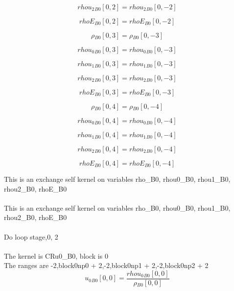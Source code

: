 \documentclass{article}
\begin{document}
\begin{dmath}{rhou_{2}{_{B0}}}[{0,2}] = {rhou_{2}{_{B0}}}[{0,-2}]\end{dmath}

\begin{dmath}{rhoE{_{B0}}}[{0,2}] = {rhoE{_{B0}}}[{0,-2}]\end{dmath}

\begin{dmath}{\rho{_{B0}}}[{0,3}] = {\rho{_{B0}}}[{0,-3}]\end{dmath}

\begin{dmath}{rhou_{0}{_{B0}}}[{0,3}] = {rhou_{0}{_{B0}}}[{0,-3}]\end{dmath}

\begin{dmath}{rhou_{1}{_{B0}}}[{0,3}] = {rhou_{1}{_{B0}}}[{0,-3}]\end{dmath}

\begin{dmath}{rhou_{2}{_{B0}}}[{0,3}] = {rhou_{2}{_{B0}}}[{0,-3}]\end{dmath}

\begin{dmath}{rhoE{_{B0}}}[{0,3}] = {rhoE{_{B0}}}[{0,-3}]\end{dmath}

\begin{dmath}{\rho{_{B0}}}[{0,4}] = {\rho{_{B0}}}[{0,-4}]\end{dmath}

\begin{dmath}{rhou_{0}{_{B0}}}[{0,4}] = {rhou_{0}{_{B0}}}[{0,-4}]\end{dmath}

\begin{dmath}{rhou_{1}{_{B0}}}[{0,4}] = {rhou_{1}{_{B0}}}[{0,-4}]\end{dmath}

\begin{dmath}{rhou_{2}{_{B0}}}[{0,4}] = {rhou_{2}{_{B0}}}[{0,-4}]\end{dmath}

\begin{dmath}{rhoE{_{B0}}}[{0,4}] = {rhoE{_{B0}}}[{0,-4}]\end{dmath}

\noindent This is an exchange self kernel on variables rho_B0, rhou0_B0, rhou1_B0, rhou2_B0, rhoE_B0\\\\\noindent This is an exchange self kernel on variables rho_B0, rhou0_B0, rhou1_B0, rhou2_B0, rhoE_B0\\\\\noindent Do loop stage,0, 2\\
\\\noindent The kernel is CRu0_B0, block is 0\\\noindent The ranges are -2,block0np0 + 2,-2,block0np1 + 2,-2,block0np2 + 2\\\begin{dmath}{u_{0}{_{B0}}}[{0,0}] = \frac{{rhou_{0}{_{B0}}}[{0,0}]}{{\rho{_{B0}}}[{0,0}]}\end{dmath}
\end{document}
